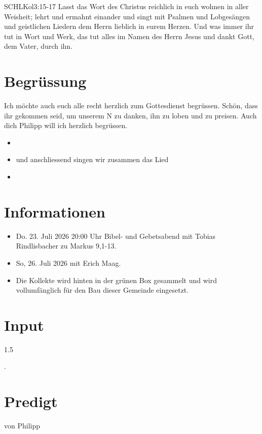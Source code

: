 \documentclass[fontsize=14pt]{mybib}
\author{OTS}
\newcommand{\Name}{Philipp}
\begin{document}
\begin{bibelbox}{SCHL}{Kol}{3:15-17}
    Lasst das Wort des Christus reichlich in euch wohnen in aller Weisheit; lehrt und ermahnt einander und singt mit Psalmen und Lobgesängen und geistlichen Liedern dem Herrn lieblich in eurem Herzen. Und was immer ihr tut in Wort und Werk, das tut alles im Namen des Herrn Jesus und dankt Gott, dem Vater, durch ihn.
\end{bibelbox}
\section{Begrüssung}
Ich möchte auch euch alle recht herzlich zum Gottesdienst begrüssen. Schön, dass ihr gekommen seid, um unserem \herr N zu danken, ihn zu loben und zu preisen. 
Auch dich \Name{} will ich herzlich begrüssen. 

\begin{itemize}
    \item[] 
    \item[] und anschliessend singen wir zusammen das Lied
    \item[] 
\end{itemize}
\section{Informationen}
\begin{itemize}
    \item {} Do. 23. Juli 2026 20:00 Uhr Bibel- und Gebetsabend mit Tobias Rindlisbacher zu Markus 9,1-13.\\
    \item {} So, 26. Juli 2026 mit Erich Maag.
    \item {} Die Kollekte wird hinten in der grünen Box gesammelt und wird vollumfänglich für den Bau dieser Gemeinde eingesetzt.
\end{itemize}
\section{Input}
\begin{spacing}{1.5}
      
    .
\end{spacing}
\section{Predigt}
    von \Name{}
\end{document}
